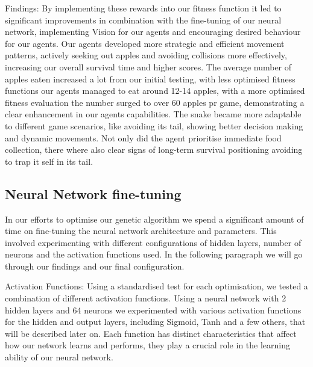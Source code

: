 \documentclass[a4paper, twocolumn]{article}
\begin{document}
Findings:
By implementing these rewards into our fitness function it led to significant improvements in combination with the fine-tuning of our neural network, implementing Vision for our agents and encouraging desired behaviour for our agents. Our agents developed more strategic and efficient movement patterns, actively seeking out apples and avoiding collisions more effectively, increasing our overall survival time and higher scores. The average number of apples eaten increased a lot from our initial testing, with less optimised fitness functions our agents managed to eat around 12-14 apples, with a more optimised fitness evaluation the number surged to over 60 apples pr game, demonstrating a clear enhancement in our agents capabilities. The snake became more adaptable to different game scenarios, like avoiding its tail, showing better decision making and dynamic movements. Not only did the agent prioritise immediate food collection, there where also clear signs of long-term survival positioning avoiding to trap it self in its tail. 

\subsection{Neural Network fine-tuning\label{sec:Neural Network fine-tuning}}

In our efforts to optimise our genetic algorithm we spend a significant amount of time on fine-tuning the neural network architecture and parameters. This involved experimenting with different configurations of hidden layers, number of neurons and the activation functions used. In the following paragraph we will go through our findings and our final configuration. 

Activation Functions: 
Using a standardised test for each optimisation, we tested a combination of different activation functions. Using a neural network with 2 hidden layers and 64 neurons we experimented with various activation functions for the hidden and output layers, including Sigmoid, Tanh and a few others, that will be described later on. Each function has distinct characteristics that affect how our network learns and performs, they play a crucial role in the learning ability of our neural network. 
\end{document}
